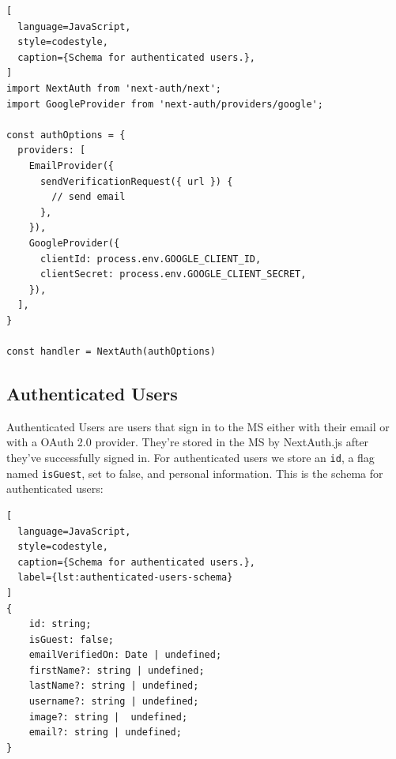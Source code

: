 
\begin{lstlisting}[
  language=JavaScript,
  style=codestyle,
  caption={Schema for authenticated users.},
]
import NextAuth from 'next-auth/next';
import GoogleProvider from 'next-auth/providers/google';

const authOptions = {
  providers: [
    EmailProvider({
      sendVerificationRequest({ url }) {
        // send email
      },
    }),
    GoogleProvider({
      clientId: process.env.GOOGLE_CLIENT_ID,
      clientSecret: process.env.GOOGLE_CLIENT_SECRET,
    }),
  ],
}

const handler = NextAuth(authOptions)
\end{lstlisting}


%
%


\subsection{Authenticated Users}
\label{cha:ms-architecture:authenticated-users}

Authenticated Users are users that sign in to the MS either with their email or with a
OAuth 2.0 provider.
They're stored in the MS by NextAuth.js after they've successfully signed in.
For authenticated users we store an \lstinline{id}, a flag named \lstinline{isGuest}, set
to false, and personal information. 
This is the schema for authenticated users:


\begin{lstlisting}[
  language=JavaScript,
  style=codestyle,
  caption={Schema for authenticated users.},
  label={lst:authenticated-users-schema}
]
{
    id: string;
    isGuest: false;
    emailVerifiedOn: Date | undefined;
    firstName?: string | undefined;
    lastName?: string | undefined;
    username?: string | undefined;
    image?: string |  undefined;
    email?: string | undefined;
}

\end{lstlisting}

